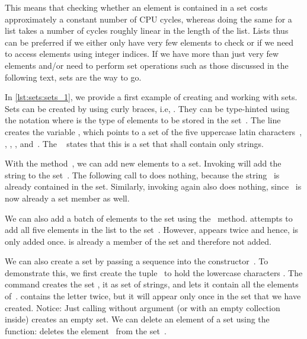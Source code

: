 This means that checking whether an element is contained in a set costs approximately a constant number of CPU cycles, whereas doing the same for a list takes a number of cycles roughly linear in the length of the list.
Lists thus can be preferred if we either only have very few elements to check or if we need to access elements using integer indices.
If we have more than just very few elements and/or need to perform set operations such as those discussed in the following text, sets are the way to go.%
%
\begin{sloppypar}%
In \cref{lst:sets:sets_1}, we provide a first example of creating and working with sets.
Sets can be created by using curly braces, i.e, .
They can be type-hinted using the notation  where  is the type of elements to be stored in the set~\cite{PEP585}.
The line  creates the variable , which points to a set of the five uppercase latin characters~, , , , and~.
The ~ states that this is a set that shall contain only strings.%
\end{sloppypar}%
%
With the method~, we can add new elements to a set.
Invoking  will add the string  to the set~.
The following call to  does nothing, because the string~ is already contained in the set.
Similarly, invoking  again also does nothing, since~ is now already a set member as well.%
%
\begin{sloppypar}%
We can also add a batch of elements to the set using the ~method.
 attempts to add all five elements in the list \pythonil{["K", "G", "W", "Q", "W"]} to the set~.
However,  appears twice and hence, is only added once.
 is already a member of the set and therefore not added.%
\end{sloppypar}%
%
We can also create a set by passing a sequence into the constructor~.
To demonstrate this, we first create the tuple~ to hold the lowercase characters .
The command  creates the set ,  it as set of strings, and lets it contain all the elements of~.
 contains the letter  twice, but it will appear only once in the set that we have created.
Notice: Just calling  without argument (or with an empty collection inside) creates an empty set.
We can delete an element of a set using the  function:
 deletes the element~ from the set~.

